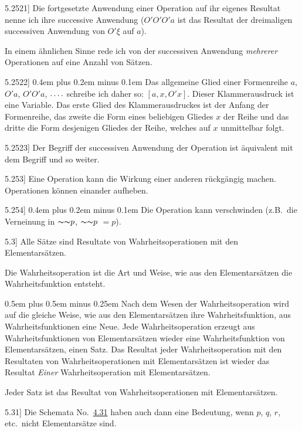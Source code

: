 \documentclass[12pt,oneside]{book}[2007/10/19]
\newcommand{\PropERef}[1]{\hyperref[PropE:#1]{#1}}
\newcommand{\PropositionG}[2]{%
  \item[\phantomsection\label{PropG:#1}\PropERef{#1}] #2%
}
\newcommand{\PropGRef}[1]{\hyperref[PropG:#1]{#1}}
\newcommand{\DPtypo}[2]{#2}
\newcommand{\Not}[1]{\mathord{\thicksim} #1}
\newcommand{\Emph}[1]{\emph{#1}}%
\newcommand{\zumBeispiel}{z.\;B.}
\newcommand{\fourdots}{\mathinner{\ldotp\ldotp\ldotp\ldotp}}
\newcommand{\stretchyspace}{\spaceskip0.4em plus 0.2em minus 0.1em}
\newcommand{\verystretchyspace}{\spaceskip0.5em plus 0.5em minus 0.25em}
\begin{document}
\begin{propositions}
\PropositionG{5.2521}
{Die fortgesetzte Anwendung einer Operation
\enlargethispage{2pt} %
auf ihr eigenes Resultat nenne ich ihre successive
Anwendung (\glqq{}$O' O' O' a$\grqq{} ist das Resultat der
dreimaligen successiven Anwendung von \glqq{}$O' \xi$\grqq{}
auf \glqq{}$a$\grqq{}).

In einem ähnlichen Sinne rede ich von der
successiven Anwendung \Emph{mehrerer} Operationen
auf eine Anzahl von Sätzen.}


\PropositionG{5.2522}
{{\stretchyspace
Das allgemeine Glied einer Formenreihe $a$, $O' a$,
$O' O' a$, $\fourdots$ schreibe ich daher so: \glqq{}$[a, x, O' x]$\grqq{}.
Dieser Klammerausdruck ist eine Variable. Das
erste Glied des Klammerausdruckes ist der Anfang
der Formenreihe, das zweite die Form eines
beliebigen Gliedes $x$ der Reihe und das dritte
die Form desjenigen Gliedes der Reihe, welches
auf $x$ unmittelbar folgt.}}


\PropositionG{5.2523}
{Der Begriff der successiven Anwendung der
Operation ist äquivalent mit dem Begriff \glqq{}und so
weiter\grqq{}.}


\PropositionG{5.253}
{Eine Operation kann die Wirkung einer anderen
rückgängig machen. Operationen können einander
aufheben.}


\PropositionG{5.254}
{\stretchyspace
{Die Operation kann verschwinden (\zumBeispiel\ die
Verneinung in \glqq{}$\Not{\Not{p}}$\grqq{}\DPtypo{}{,} $\Not{\Not{p}}$ $= p$).}}


\PropositionG{5.3}
{Alle Sätze sind Resultate von Wahrheitsoperationen
mit den Elementarsätzen.

Die Wahrheitsoperation ist die Art und Weise,
wie aus den Elementarsätzen die Wahrheitsfunktion
entsteht.

{\verystretchyspace
Nach dem Wesen der Wahrheitsoperation wird
auf die gleiche Weise, wie aus den Elementarsätzen
ihre Wahrheitsfunktion, aus Wahrheitsfunktionen
eine Neue. Jede Wahrheitsoperation erzeugt aus
Wahrheitsfunktionen von Elementarsätzen wieder
eine Wahrheitsfunktion von Elementarsätzen, einen
Satz. Das Resultat jeder Wahrheitsoperation mit
den Resultaten von Wahrheitsoperationen mit
Elementarsätzen ist wieder das Resultat \Emph{Einer}
Wahrheitsoperation mit Elementarsätzen.}

Jeder Satz ist das Resultat von Wahrheitsoperationen
mit Elementarsätzen.}


\PropositionG{5.31}
{Die Schemata No.~\PropGRef{4.31} haben auch dann eine
Bedeutung, wenn \glqq{}$p$\grqq{}, \glqq{}$q$\grqq{}, \glqq{}$r$\grqq{}, etc.\ nicht Elementarsätze
sind.

}
\end{propositions}
\end{document}
